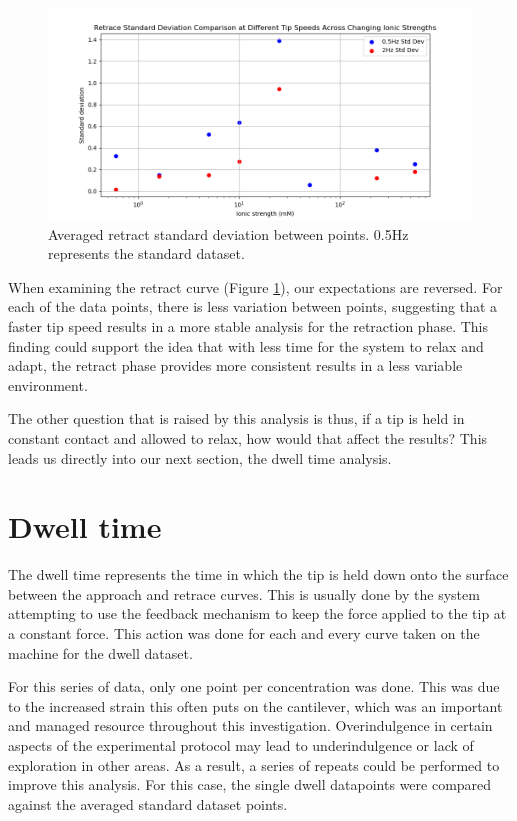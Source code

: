 \begin{figure}[h!!!]
\centering
\includegraphics[width=\textwidth]{chapter7/Tip speed/Standard deviation change retract.png}
\caption{Averaged retract standard deviation between points. 0.5Hz represents the standard dataset.}
\label{fig:RetractAverageSpeedDev}
\end{figure}

When examining the retract curve (Figure \ref{fig:RetractAverageSpeedDev}), our expectations are reversed. For each of the data points, there is less variation between points, suggesting that a faster tip speed results in a more stable analysis for the retraction phase. This finding could support the idea that with less time for the system to relax and adapt, the retract phase provides more consistent results in a less variable environment.

The other question that is raised by this analysis is thus, if a tip is held in constant contact and allowed to relax, how would that affect the results? This leads us directly into our next section, the dwell time analysis.

\section{Dwell time}

The dwell time represents the time in which the tip is held down onto the surface between the approach and retrace curves. This is usually done by the system attempting to use the feedback mechanism to keep the force applied to the tip at a constant force. This action was done for each and every curve taken on the machine for the dwell dataset.

For this series of data, only one point per concentration was done. This was due to the increased strain this often puts on the cantilever, which was an important and managed resource throughout this investigation. Overindulgence in certain aspects of the experimental protocol may lead to underindulgence or lack of exploration in other areas. As a result, a series of repeats could be performed to improve this analysis. For this case, the single dwell datapoints were compared against the averaged standard dataset points.

